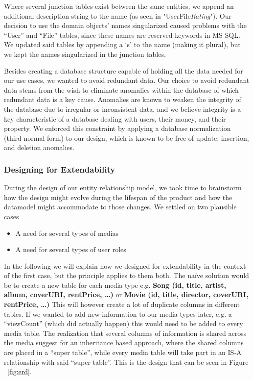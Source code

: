 Where several junction tables exist between the same entities, we append an additional description string to the name (as seen in "UserFile\textit{Rating}").
Our decision to use the domain objects' names singularized caused problems with the “User” and “File” tables, since these names are reserved keywords in MS SQL. We updated said tables by appending a ‘s’ to the name (making it plural), but we kept the names singularized in the junction tables.

Besides creating a database structure capable of holding all the data needed for our use cases, we wanted to avoid redundant data. Our choice to avoid redundant data stems from the wish to eliminate anomalies within the database of which redundant data is a key cause. Anomalies are known to weaken the integrity of the database \cite{dbbook} due to irregular or inconsistent data, and we believe integrity is a key characteristic of a database dealing with users, their money, and their property. We enforced this constraint by applying a database normalization (third normal form) to our design, which is known to be free of update, insertion, and deletion anomalies.

\subsubsection{Designing for Extendability}
\label{sec:extendability}
During the design of our entity relationship model, we took time to brainstorm how the design might evolve during the lifespan of the product and how the datamodel might accommodate to those changes. We settled on two plausible cases
\begin{itemize}
\item A need for several types of medias
\item A need for several types of user roles
\end{itemize}
In the following we will explain how we designed for extendability in the context of the first case, but the principle applies to them both.
The naïve solution would be to create a new table for each media type e.g. 
\textbf{Song (id, title, artist, album, coverURI, rentPrice, …)} or
\textbf{Movie (id, title, director, coverURI, rentPrice, …)}
This will however create a lot of duplicate columns in different tables. If we wanted to add new information to our media types later, e.g. a “viewCount” (which did actually happen) this would need to be added to every media table.
The realization that several columns of information is shared across the media suggest for an inheritance based approach, where the shared columns are placed in a “super table”, while every media table will take part in an IS-A relationship with said “super table”. This is the design that can be seen in Figure ~\ref{fig:erd}.

